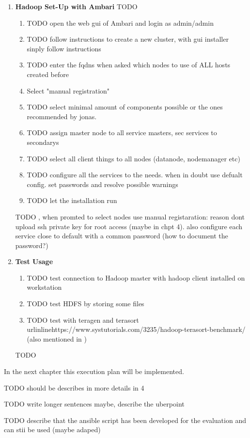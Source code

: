 \begin{enumerate}
    \item \textbf{Hadoop Set-Up with Ambari} 
    TODO
    \begin{enumerate}
        \item TODO open the web gui of Ambari and login as admin/admin
        \item TODO follow instructions to create a new cluster, with gui installer sinply follow instructions
        \item TODO enter the fqdns when asked which nodes to use of ALL hosts created before
        \item Select "manual registration"
        \item TODO select minimal amount of components possible or the ones recommended by jonas.
        \item TODO assign master node to all service masters, sec services to secondarys
        \item TODO select all client things to all nodes (datanode, nodemanager etc)
        \item TODO configure all the services to the needs. when in doubt use defualt config. set passwords and resolve possible warnings
        \item TODO let the installation run
    \end{enumerate}
    TODO ,  when promted to select nodes use manual registaration: reason dont upload ssh private key for root access (maybe in chpt 4). also configure each service close to default with a common password (how to document the password?)
    
    \item \textbf{Test Usage} 
        \begin{enumerate}
            \item TODO test connection to Hadoop master with hadoop client installed on workstation
            \item TODO test HDFS by storing some files
            \item TODO test with teragen and terasort \\urlinline{https://www.systutorials.com/3235/hadoop-terasort-benchmark/} (also mentioned in \autocite[][]{white2015hadoop})
            
        \end{enumerate}
        
    TODO

\end{enumerate}

In the next chapter this execution plan will be implemented.

TODO should be describes in more details in 4

TODO write longer sentences maybe, describe the uberpoint

TODO describe that the ansible script has been developed for the evaluation and can stii be used (maybe adaped)
